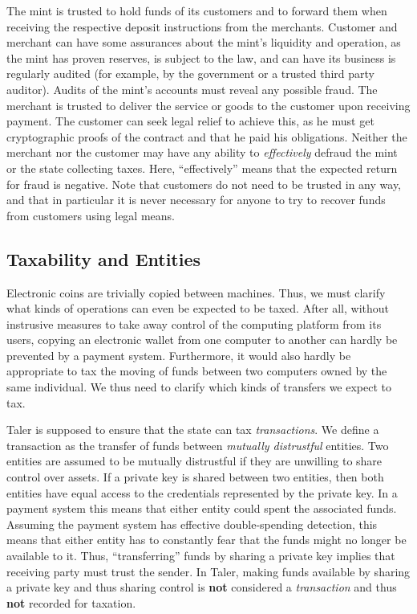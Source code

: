 \documentclass{llncs}
\begin{document}
The mint is trusted to hold funds of its customers and to forward them
when receiving the respective deposit instructions from the merchants.
Customer and merchant can have some assurances about the mint's
liquidity and operation, as the mint has proven reserves, is subject
to the law, and can have its business is regularly audited (for
example, by the government or a trusted third party auditor).
Audits of the mint's accounts must reveal any possible fraud.
%
The merchant is trusted to deliver the service or goods to the
customer upon receiving payment.  The customer can seek legal relief
to achieve this, as he must get cryptographic proofs of the contract
and that he paid his obligations.
%
Neither the merchant nor the customer may have any ability to {\em
  effectively} defraud the mint or the state collecting taxes.  Here,
``effectively'' means that the expected return for fraud is negative.
%
Note that customers do not need to be trusted in any way, and that in
particular it is never necessary for anyone to try to recover funds
from customers using legal means.


\subsection{Taxability and Entities}

Electronic coins are trivially copied between machines.  Thus, we must
clarify what kinds of operations can even be expected to be taxed.
After all, without instrusive measures to take away control of the
computing platform from its users, copying an electronic wallet from
one computer to another can hardly be prevented by a payment system.
Furthermore, it would also hardly be appropriate to tax the moving of
funds between two computers owned by the same individual.  We thus
need to clarify which kinds of transfers we expect to tax.

Taler is supposed to ensure that the state can tax {\em transactions}.
We define a transaction as the transfer of funds between {\em mutually
  distrustful} entities.  Two entities are assumed to be mutually
distrustful if they are unwilling to share control over assets.  If a
private key is shared between two entities, then both entities have
equal access to the credentials represented by the private key.  In a
payment system this means that either entity could spent the
associated funds.  Assuming the payment system has effective
double-spending detection, this means that either entity has to
constantly fear that the funds might no longer be available to it.
Thus, ``transferring'' funds by sharing a private key implies that
receiving party must trust the sender.  In Taler, making funds
available by sharing a private key and thus sharing control is {\bf
  not} considered a {\em transaction} and thus {\bf not} recorded for
taxation.
\end{document}
